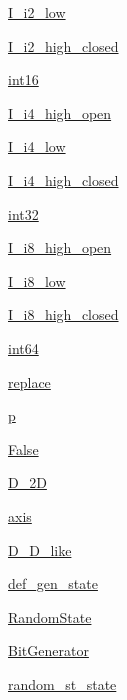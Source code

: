 \begin{DoxyCompactItemize}
\item 
\hyperlink{namespacerandom_a58ad48ddb9d62dcceafcf877135a238e}{I\+\_\+i2\+\_\+low}
\item 
\hyperlink{namespacerandom_a88cb30a175f18d08931424c5be21a85a}{I\+\_\+i2\+\_\+high\+\_\+closed}
\item 
\hyperlink{namespacerandom_a37f375659fc9917c47dd450ce615ccd0}{int16}
\item 
\hyperlink{namespacerandom_aaf8f7d0e2da6e15164471fa10325c926}{I\+\_\+i4\+\_\+high\+\_\+open}
\item 
\hyperlink{namespacerandom_afd19bdda9ac8bffea9d697bf13037d07}{I\+\_\+i4\+\_\+low}
\item 
\hyperlink{namespacerandom_aa3c47768ab1947be175e84303e5b2daf}{I\+\_\+i4\+\_\+high\+\_\+closed}
\item 
\hyperlink{namespacerandom_a0787e014708c2b1a094060986eb3750a}{int32}
\item 
\hyperlink{namespacerandom_ac989757ff813389ce706b1814084ab96}{I\+\_\+i8\+\_\+high\+\_\+open}
\item 
\hyperlink{namespacerandom_acf3dba5db20d3cb72656ecd22af252fb}{I\+\_\+i8\+\_\+low}
\item 
\hyperlink{namespacerandom_a48a00f26268bcac3dd920069dd4e5f7c}{I\+\_\+i8\+\_\+high\+\_\+closed}
\item 
\hyperlink{namespacerandom_a085874ac4089f8cce1239cb0dd8cd681}{int64}
\item 
\hyperlink{namespacerandom_a61eed39f4ef95b263b0b90c9dcc3c7ab}{replace}
\item 
\hyperlink{namespacerandom_ad29683c0830246a5f196f928020a9eec}{p}
\item 
\hyperlink{namespacerandom_a44af82c59678b0f2995b13df300d000c}{False}
\item 
\hyperlink{namespacerandom_ab9e25980ed88a1598b3db143434aa4ab}{D\+\_\+2D}
\item 
\hyperlink{namespacerandom_ae1e4502e48f9644584ce96ec8b8af2ea}{axis}
\item 
\hyperlink{namespacerandom_a70f4750894a47e8d4f229af2c9248d5f}{D\+\_\+D\+\_\+like}
\item 
\hyperlink{namespacerandom_acfaf3897cf2a0e24252adbddf44922e3}{def\+\_\+gen\+\_\+state}
\item 
\hyperlink{namespacerandom_a99515a4da2ff95cbb77878d98b572f64}{Random\+State}
\item 
\hyperlink{namespacerandom_aecaa5197ab2a2624c9c5a4bc67f94573}{Bit\+Generator}
\item 
\hyperlink{namespacerandom_a1d9d329a739546c679e25b4e752d2935}{random\+\_\+st\+\_\+state}

\end{DoxyCompactItemize}

